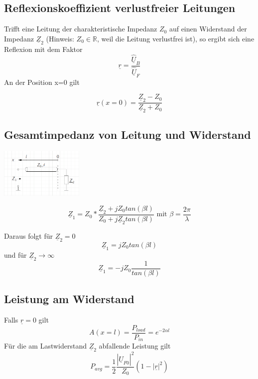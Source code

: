 \documentclass[11pt]{scrartcl}
\def\Uc{\underline{\hat U}}
\begin{document}
\subsection{Reflexionskoeffizient verlustfreier Leitungen}
Trifft eine Leitung der charakteristische Impedanz $Z_0$ auf einen Widerstand der Impedanz $\underline{Z}_2$ (Hinweis: $Z_0 \in \mathbb{R}$, weil die Leitung verlustfrei ist), so ergibt sich eine Reflexion mit dem Faktor
\begin{equation}
	\underline{r} = \frac{\Uc_B}{\Uc_F}
\end{equation}
An der Position x=0 gilt
\begin{mdframed}[backgroundcolor = sand]
	\begin{equation}
		\underline{r}(x=0) = \frac{\underline{Z}_2-Z_0}{\underline{Z}_2+Z_0} 
	\end{equation}
\end{mdframed}
\subsection{Gesamtimpedanz von Leitung und Widerstand}
\begin{center}
	\includegraphics[width=0.3\textwidth]{Grafiken/02_Leitungsimpedanz.png}
\end{center}
\begin{mdframed}[backgroundcolor = sand]
	\begin{equation}
		\underline{Z}_1 = Z_0*\frac{\underline{Z}_2+jZ_0tan(\beta l)}{Z_0+j\underline{Z}_2tan(\beta l)} \text{ mit } \beta = \frac{2\pi}{\lambda}
	\end{equation}
\end{mdframed}
Daraus folgt für $\underline{Z}_2 = 0$
\begin{equation}
	\underline{Z}_1 = jZ_0tan(\beta l)
\end{equation}
und für $\underline{Z}_2\rightarrow\infty$
\begin{equation}
	\underline{Z}_1 = -jZ_0\frac{1}{tan(\beta l)}
\end{equation}
\subsection{Leistung am Widerstand}
Falls $\underline{r} = 0$ gilt
\begin{equation}
	A(x=l) = \frac{P_{load}}{P_{in}} = e^{-2\alpha l}
\end{equation}
 Für die am Lastwiderstand $\underline{Z}_2$ abfallende Leistung gilt
 \begin{equation}
 	P_{avg} = \frac{1}{2}\frac{|\Uc_{F0}|^2}{Z_0}(1-|\underline{r}|^2)
 \end{equation}
\end{document}
